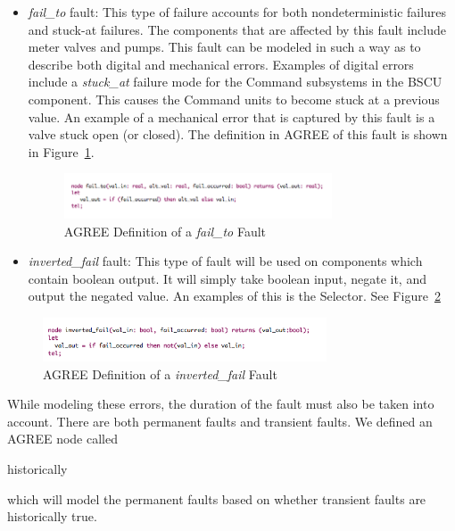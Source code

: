\begin{itemize}
\item \textit{fail\_to} fault: This type of failure accounts for both nondeterministic failures and stuck-at failures. The components that are affected by this fault include meter valves and pumps. This fault can be modeled in such a way as to describe both digital and mechanical errors. Examples of digital errors include a \textit{stuck\_at} failure mode for the Command subsystems in the BSCU component. This causes the Command units to become stuck at a previous value. An example of a mechanical error that is captured by this fault is a valve stuck open (or closed). The definition in AGREE of this fault is shown in Figure~\ref{fig:fail_to_node}.\\

\begin{figure}[t]
  \centering
 \includegraphics[width=0.75\textwidth]{images/fail_to.png}
  \vspace{-0.1in}
  \caption{AGREE Definition of a \textit{fail\_to} Fault}
  \label{fig:fail_to_node}
\end{figure}


\item \textit{inverted\_fail} fault: This type of fault will be used on components which contain boolean output. It will simply take boolean input, negate it, and output the negated value. An examples of this is the Selector. See Figure~\ref{fig:inverted_fail_node}

\end{itemize}

\begin{figure}[htbp]
  \centering
 \includegraphics[width=0.75\textwidth]{images/inverted_fail.png}
  \vspace{-0.1in}
  \caption{AGREE Definition of a \textit{inverted\_fail} Fault}
  \label{fig:inverted_fail_node}
\end{figure}

While modeling these errors, the duration of the fault must also be taken into account. There are both permanent faults and transient faults. We defined an AGREE node called 
\begin{tt}
historically
\end{tt}
which will model the permanent faults based on whether transient faults are historically true. 

